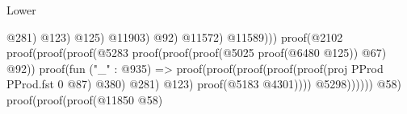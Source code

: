 \begin{lexlean}{Lower}
\begin{coremodule}
                                                                                                      @281)
                                                                                                    @123)
                                                                                                  @125)
                                                                                                @11903)
                                                                                              @92)
                                                                                            @11572)
                                                                                          @11589)))
                                                                                proof(@2102
                                                                                    proof(proof(proof(@5283
                                                                                            proof(proof(proof(@5025
                                                                                                    proof(@6480
                                                                                                        @125))
                                                                                                  @67)
                                                                                                @92))
                                                                                          proof(fun ("_" : @935) =>
                                                                                            proof(proof(proof(proof(proof(proj PProd PProd.fst 0
                                                                                                      @87)
                                                                                                      @380)
                                                                                                    @281)
                                                                                                  @123)
                                                                                                proof(@5183
                                                                                                    @4301))))
                                                                                        @5298))))))
                                                                      @58)
                                                                    proof(proof(proof(@11850 @58)

\end{coremodule}
\end{lexlean}
